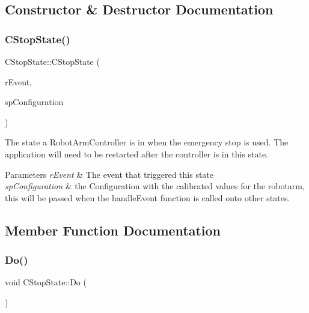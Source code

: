 \subsection{Constructor \& Destructor Documentation}
\mbox{\label{classCStopState_ac1e10af0a555c8d0df9964d2bf67172c}} 
\subsubsection{\texorpdfstring{C\+Stop\+State()}{CStopState()}}
{\footnotesize\ttfamily C\+Stop\+State\+::\+C\+Stop\+State (\begin{DoxyParamCaption}\item[{\hyperlink{classCEvent}{C\+Event} \&}]{r\+Event,  }\item[{std\+::shared\+\_\+ptr$<$ \hyperlink{classCConfiguration}{C\+Configuration} $>$}]{sp\+Configuration }\end{DoxyParamCaption})}



The state a Robot\+Arm\+Controller is in when the emergency stop is used. The application will need to be restarted after the controller is in this state. 


\begin{DoxyParams}{Parameters}
{\em r\+Event} & The event that triggered this state \\
\hline
{\em sp\+Configuration} & the Configuration with the calibrated values for the robotarm, this will be passed when the handle\+Event function is called onto other states. \\
\hline
\end{DoxyParams}


\subsection{Member Function Documentation}
\mbox{\label{classCStopState_aba51445ef29e03fa5ffc5cef48923a10}} 
\subsubsection{\texorpdfstring{Do()}{Do()}}
{\footnotesize\ttfamily void C\+Stop\+State\+::\+Do (\begin{DoxyParamCaption}{ }\end{DoxyParamCaption})\hspace{0.3cm}{\ttfamily [virtual]}}



